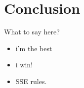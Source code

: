 \section{Conclusion}
\label{Conclusion}

What to say here?

\begin{itemize}
\item i'm the best
\item i win!
\item SSE rules.
\end{itemize}